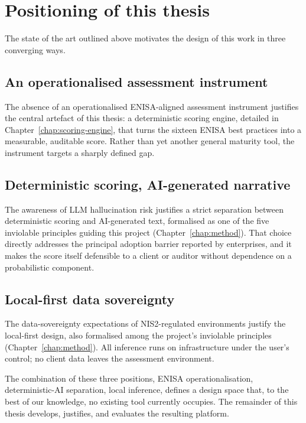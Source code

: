 \section{Positioning of this thesis}

The state of the art outlined above motivates the design of this work in three converging ways.

\subsection{An operationalised assessment instrument}
\label{sec:soa-operationalised-instrument}

The absence of an operationalised ENISA-aligned assessment instrument justifies the central artefact of this thesis: a deterministic scoring engine, detailed in Chapter~\ref{chap:scoring-engine}, that turns the sixteen ENISA best practices into a measurable, auditable score. Rather than yet another general maturity tool, the instrument targets a sharply defined gap.

\subsection{Deterministic scoring, AI-generated narrative}
\label{sec:soa-deterministic-ai-separation}

The awareness of LLM hallucination risk justifies a strict separation between deterministic scoring and AI-generated text, formalised as one of the five inviolable principles guiding this project (Chapter~\ref{chap:method}). That choice directly addresses the principal adoption barrier reported by enterprises, and it makes the score itself defensible to a client or auditor without dependence on a probabilistic component.

\subsection{Local-first data sovereignty}
\label{sec:soa-local-first-sovereignty}

The data-sovereignty expectations of NIS2-regulated environments justify the local-first design, also formalised among the project's inviolable principles (Chapter~\ref{chap:method}). All inference runs on infrastructure under the user's control; no client data leaves the assessment environment.

The combination of these three positions, ENISA operationalisation, deterministic-AI separation, local inference, defines a design space that, to the best of our knowledge, no existing tool currently occupies. The remainder of this thesis develops, justifies, and evaluates the resulting platform.